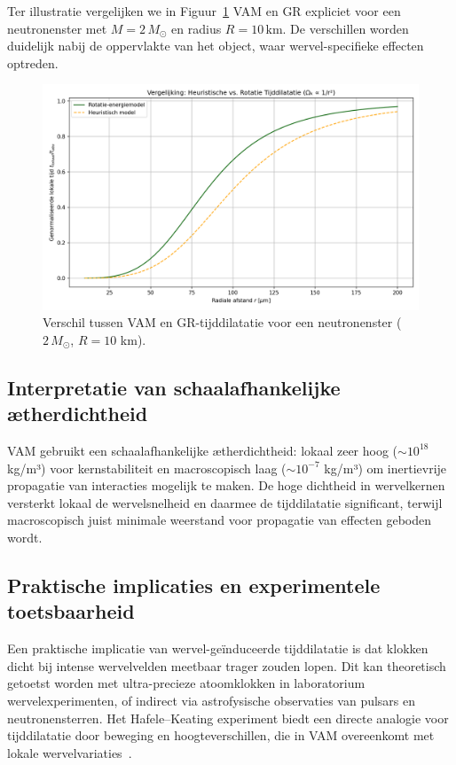 Ter illustratie vergelijken we in Figuur~\ref{fig:vergelijkingVAMGR} VAM en GR expliciet voor een neutronenster met $M = 2\,M_\odot$ en radius $R = 10\,\text{km}$. De verschillen worden duidelijk nabij de oppervlakte van het object, waar wervel-specifieke effecten optreden.

\begin{figure}[ht!]
    \centering
    \includegraphics[width=0.7\linewidth]{04-RotationalVsHeuristicTimeDilation_nl}
    \caption{Verschil tussen VAM en GR-tijddilatatie voor een neutronenster ($2\,M_\odot$, $R=10$ km).}
    \label{fig:vergelijkingVAMGR}
\end{figure}

\subsection{Interpretatie van schaalafhankelijke ætherdichtheid}

VAM gebruikt een schaalafhankelijke ætherdichtheid: lokaal zeer hoog ($\sim10^{18}$ kg/m³) voor kernstabiliteit en macroscopisch laag ($\sim10^{-7}$ kg/m³) om inertievrije propagatie van interacties mogelijk te maken. De hoge dichtheid in wervelkernen versterkt lokaal de wervelsnelheid en daarmee de tijddilatatie significant, terwijl macroscopisch juist minimale weerstand voor propagatie van effecten geboden wordt.

\subsection{Praktische implicaties en experimentele toetsbaarheid}

Een praktische implicatie van wervel-geïnduceerde tijddilatatie is dat klokken dicht bij intense wervelvelden meetbaar trager zouden lopen. Dit kan theoretisch getoetst worden met ultra-precieze atoomklokken in laboratorium wervelexperimenten, of indirect via astrofysische observaties van pulsars en neutronensterren. Het Hafele–Keating experiment biedt een directe analogie voor tijddilatatie door beweging en hoogteverschillen, die in VAM overeenkomt met lokale wervelvariaties~\cite{hafele1972around}.

